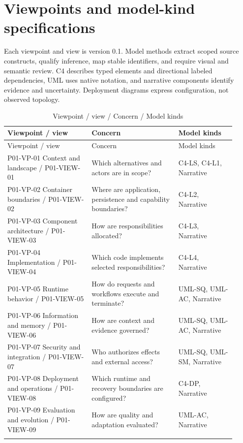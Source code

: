 \documentclass[10pt,letterpaper]{article}
\begin{document}
\section{Viewpoints and model-kind specifications}
Each viewpoint and view is version 0.1. Model methods extract scoped source constructs, qualify inference, map stable identifiers, and require visual and semantic review. C4 describes typed elements and directional labeled dependencies, UML uses native notation, and narrative components identify evidence and uncertainty. Deployment diagrams express configuration, not observed topology.
\begin{longtable}{@{}>{\raggedright\arraybackslash}p{0.34\linewidth}>{\raggedright\arraybackslash}p{0.35\linewidth}>{\raggedright\arraybackslash}p{0.23\linewidth}@{}}
\caption{Viewpoint / view / Concern / Model kinds}\\
\toprule Viewpoint / view & Concern & Model kinds\\\midrule\endfirsthead
\toprule Viewpoint / view & Concern & Model kinds\\\midrule\endhead
P01-VP-01 Context and landscape / P01-VIEW-01 & Which alternatives and actors are in scope? & C4-LS, C4-L1, Narrative\\\addlinespace
P01-VP-02 Container boundaries / P01-VIEW-02 & Where are application, persistence and capability boundaries? & C4-L2, Narrative\\\addlinespace
P01-VP-03 Component architecture / P01-VIEW-03 & How are responsibilities allocated? & C4-L3, Narrative\\\addlinespace
P01-VP-04 Implementation / P01-VIEW-04 & Which code implements selected responsibilities? & C4-L4, Narrative\\\addlinespace
P01-VP-05 Runtime behavior / P01-VIEW-05 & How do requests and workflows execute and terminate? & UML-SQ, UML-AC, Narrative\\\addlinespace
P01-VP-06 Information and memory / P01-VIEW-06 & How are context and evidence governed? & UML-SQ, UML-AC, Narrative\\\addlinespace
P01-VP-07 Security and integration / P01-VIEW-07 & Who authorizes effects and external access? & UML-SQ, UML-SM, Narrative\\\addlinespace
P01-VP-08 Deployment and operations / P01-VIEW-08 & Which runtime and recovery boundaries are configured? & C4-DP, Narrative\\\addlinespace
P01-VP-09 Evaluation and evolution / P01-VIEW-09 & How are quality and adaptation evaluated? & UML-AC, Narrative\\\addlinespace
\bottomrule\end{longtable}
\end{document}
